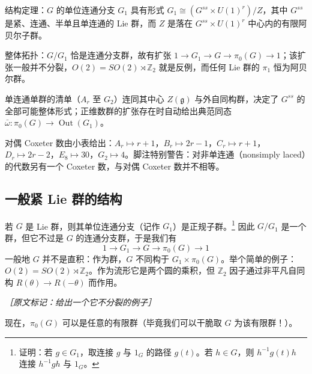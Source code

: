 \begin{keytakeaways}
  \item 结构定理：$G$ 的单位连通分支 $G_1$ 具有形式 $G_1\cong(G^{ss}\times U(1)^r)/Z$，其中 $G^{ss}$ 是紧、连通、半单且单连通的 Lie 群，而 $Z$ 是落在 $G^{ss}\times U(1)^r$ 中心内的有限阿贝尔子群。
  \item 整体拓扑：$G/G_1$ 恰是连通分支群，故有扩张 $1\to G_1\to G\to\pi_0(G)\to 1$；该扩张一般并不分裂，$O(2)=SO(2)\rtimes\mathbb{Z}_2$ 就是反例，而任何 Lie 群的 $\pi_1$ 恒为阿贝尔群。
  \item 单连通单群的清单（$A_r$ 至 $G_2$）连同其中心 $Z(\mathfrak{g})$ 与外自同构群，决定了 $G^{ss}$ 的全部可能整体形式；正维数群的扩张存在时自动给出典范同态 $\bar\omega:\pi_0(G)\to\operatorname{Out}(G_1)$。
  \item 对偶 Coxeter 数由小表给出：$A_r\mapsto r+1$，$B_r\mapsto 2r-1$，$C_r\mapsto r+1$，$D_r\mapsto 2r-2$，$E_8\mapsto 30$，$G_2\mapsto 4$。脚注特别警告：对非单连通（nonsimply laced）的代数另有一个 Coxeter 数，与对偶 Coxeter 数并不相等。
\end{keytakeaways}

\subsection{一般紧 Lie 群的结构} %

若 $G$ 是 Lie 群，则其单位连通分支（记作 $G_1$）是正规子群。\footnote{证明：若 $g\in G_1$，取连接 $g$ 与 $1_G$ 的路径 $g(t)$。若 $h\in G$，则 $h^{-1}g(t)h$ 连接 $h^{-1}gh$ 与 $1_G$。} 因此 $G/G_1$ 是一个群，但它不过是 $G$ 的连通分支群，于是我们有
\begin{equation}
1\to G_1\to G\to\pi_0(G)\to 1
\tag{J.1}
\label{eq:J.1}
\end{equation}
一般地 $G$ 并不是直积：作为群，$G$ 不同构于 $G_1\times\pi_0(G)$。举个简单的例子：$O(2)=SO(2)\rtimes\mathbb{Z}_2$。作为流形它是两个圆的乘积，但 $\mathbb{Z}_2$ 因子通过非平凡自同构 $R(\theta)\to R(-\theta)$ 而作用。

{\small\itshape ［原文标记：给出一个它不分裂的例子］}

现在，$\pi_0(G)$ 可以是任意的有限群（毕竟我们可以干脆取 $G$ 为该有限群！）。

